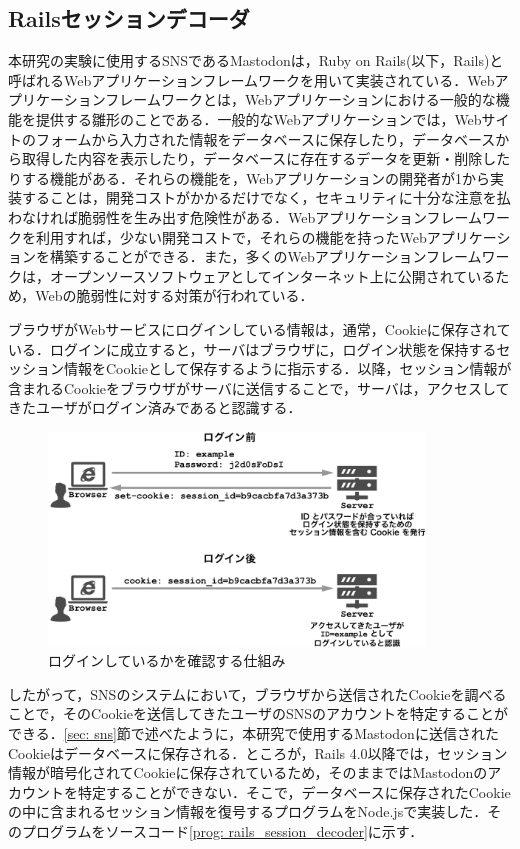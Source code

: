\documentclass[10pt, a4paper]{jreport}
\begin{document}
\subsection{Railsセッションデコーダ}\label{sec: rails_session_decoder}
本研究の実験に使用するSNSであるMastodonは，Ruby on Rails(以下，Rails)と呼ばれるWebアプリケーションフレームワークを用いて実装されている．Webアプリケーションフレームワークとは，Webアプリケーションにおける一般的な機能を提供する雛形のことである．一般的なWebアプリケーションでは，Webサイトのフォームから入力された情報をデータベースに保存したり，データベースから取得した内容を表示したり，データベースに存在するデータを更新・削除したりする機能がある．それらの機能を，Webアプリケーションの開発者が1から実装することは，開発コストがかかるだけでなく，セキュリティに十分な注意を払わなければ脆弱性を生み出す危険性がある．Webアプリケーションフレームワークを利用すれば，少ない開発コストで，それらの機能を持ったWebアプリケーションを構築することができる．また，多くのWebアプリケーションフレームワークは，オープンソースソフトウェアとしてインターネット上に公開されているため，Webの脆弱性に対する対策が行われている．

ブラウザがWebサービスにログインしている情報は，通常，Cookieに保存されている．ログインに成立すると，サーバはブラウザに，ログイン状態を保持するセッション情報をCookieとして保存するように指示する．以降，セッション情報が含まれるCookieをブラウザがサーバに送信することで，サーバは，アクセスしてきたユーザがログイン済みであると認識する．

\begin{figure}[H]
	\begin{center}
		\includegraphics[width=100mm]{figures/session_cookie.pdf}
	\end{center}
	\caption{ログインしているかを確認する仕組み}
	\label{fig: session_cookie}
\end{figure}

したがって，SNSのシステムにおいて，ブラウザから送信されたCookieを調べることで，そのCookieを送信してきたユーザのSNSのアカウントを特定することができる．\ref{sec: sns}節で述べたように，本研究で使用するMastodonに送信されたCookieはデータベースに保存される．ところが，Rails 4.0以降では，セッション情報が暗号化されてCookieに保存されている\cite{rails_session_is_encrypted}ため，そのままではMastodonのアカウントを特定することができない．そこで，データベースに保存されたCookieの中に含まれるセッション情報を復号するプログラムをNode.jsで実装した．そのプログラムをソースコード\ref{prog: rails_session_decoder}に示す．
\end{document}
